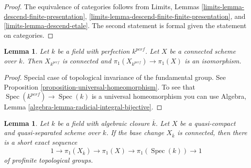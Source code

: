 \documentclass{stacks-project}
\theoremstyle{plain}
\newtheorem{lemma}[subsection]{Lemma}
\theoremstyle{definition}
\theoremstyle{remark}
\numberwithin{equation}{subsection}
\def\Spec{\mathop{\mathrm{Spec}}}
\begin{document}
\begin{proof}
The equivalence of categories follows from Limits, Lemmas
\ref{limits-lemma-descend-finite-presentation},
\ref{limits-lemma-descend-finite-finite-presentation}, and
\ref{limits-lemma-descend-etale}.
The second statement is formal given the statement on
categories.
\end{proof}

\begin{lemma}
\label{lemma-perfection}
Let $k$ be a field with perfection $k^{perf}$. Let $X$ be a connected scheme
over $k$. Then $X_{k^{perf}}$ is connected and
$\pi_1(X_{k^{perf}}) \to \pi_1(X)$ is an isomorphism.
\end{lemma}

\begin{proof}
Special case of topological invariance of the fundamental group.
See Proposition \ref{proposition-universal-homeomorphism}.
To see that $\Spec(k^{perf}) \to \Spec(k)$ is a universal
homeomorphism you can use
Algebra, Lemma \ref{algebra-lemma-radicial-integral-bijective}.
\end{proof}

\begin{lemma}
\label{lemma-ses-field}
Let $k$ be a field with algebraic closure $\overline{k}$.
Let $X$ be a quasi-compact and quasi-separated scheme over $k$.
If the base change $X_{\overline{k}}$ is connected, then
there is a short exact sequence
$$
1 \to \pi_1(X_{\overline{k}}) \to \pi_1(X) \to \pi_1(\Spec(k)) \to 1
$$
of profinite topological groups.
\end{lemma}
\end{document}
